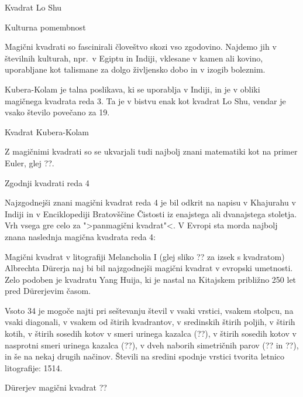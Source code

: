 \documentclass[a4paper,12pt]{article}
\begin{document}
Kvadrat Lo Shu


Kulturna pomembnost

Magični kvadrati so fascinirali človeštvo skozi vso zgodovino. Najdemo jih
v številnih kulturah, npr.\ v Egiptu in Indiji, vklesane v kamen ali
kovino, uporabljane kot talismane za dolgo življensko dobo in v
izogib boleznim.

Kubera-Kolam je talna poslikava, ki se uporablja v Indiji, in je v
obliki magičnega kvadrata reda 3. Ta je v bistvu enak kot kvadrat
Lo Shu, vendar je vsako število povečano za 19.

Kvadrat Kubera-Kolam

Z magičnimi kvadrati so se ukvarjali tudi najbolj znani matematiki kot na
primer Euler, glej ??.


Zgodnji kvadrati reda 4

Najzgodnejši znani magični kvadrat reda 4 je bil odkrit na napisu
v Khajurahu v Indiji in v Enciklopediji Bratovščine Čistosti iz enajstega
ali dvanajstega stoletja. Vrh vsega gre celo za ">panmagični kvadrat"<.
V Evropi sta morda najbolj znana naslednja magična kvadrata reda 4:

Magični kvadrat v litografiji Melancholia I (glej sliko ??
za izsek s kvadratom) Albrechta Dürerja naj bi bil najzgodnejši magični kvadrat
v evropski umetnosti. Zelo podoben je kvadratu Yang Huija, ki je nastal na Kitajskem
približno 250 let pred Dürerjevim časom.

Vsoto 34 je mogoče najti pri seštevanju števil v vsaki vrstici, vsakem stolpcu,
na vsaki diagonali, v vsakem od štirih kvadrantov, v sredinskih štirih poljih,
v štirih kotih, v štirih sosedih kotov v smeri urinega kazalca (??), v
štirih sosedih kotov v nasprotni smeri urinega kazalca (??), v dveh naborih
simetričnih parov (?? in ??), in še na nekaj drugih načinov.
Števili na sredini spodnje vrstici tvorita letnico litografije: 1514.

Dürerjev magični kvadrat ??
\end{document}
